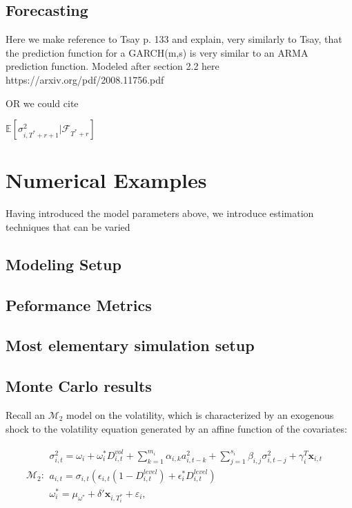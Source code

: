 \documentclass[11pt]{article}
\newcommand{\x}{\textbf{x}}
\def\mbf#1{\mathbf{#1}} %
\def\mc#1{\mathcal{#1}} %
\def\mc#1{\mathcal{#1}}
\theoremstyle{definition}
\begin{document}
\subsection{Forecasting}

Here we make reference to Tsay p. 133 and explain, very similarly to Tsay, that the prediction function for a GARCH(m,s) is very similar to an ARMA prediction function.  Modeled after section 2.2 here https://arxiv.org/pdf/2008.11756.pdf

OR we could cite \citet{zivot2009practical}

$\mathbb{E}[ \sigma^{2}_{i,T^{*}+r+1} |\mathcal{F}_{T^{*}+r}]$

\section{Numerical Examples}

Having introduced the model parameters above, we introduce estimation techniques that can be varied

\subsection{Modeling Setup}

\subsection{Peformance Metrics}

\subsection{Most elementary simulation setup}

\subsection{Monte Carlo results}
Recall an $\mc{M}_2$ model on the volatility, which is characterized by an exogenous shock to the volatility equation generated by an affine function of the covariates:

\begin{align*}
\mc{M}_2 \colon \begin{array}{l}
   \sigma^{2}_{i,t} = \omega_{i} + \omega^{*}_i D^{vol}_{i,t} + \sum^{m_{i}}_{k=1}\alpha_{i,k}a^{2}_{i,t-k} + \sum_{j=1}^{s_{i}}\beta_{i,j}\sigma_{i,t-j}^{2} + \gamma_{i}^{T} \x_{i,t} \text{ }\\[.2cm]
   a_{i,t} = \sigma_{i,t}(\epsilon_{i,t}(1-D^{level}_{i,t}) + \epsilon^{*}_{i}D^{level}_{i,t})\\[.2cm]
   \omega_i^{*} = \mu_{\omega^{*}}+\delta'\mbf{x}_{i, T_i^*}+ \varepsilon_{i},
\end{array}
\end{align*}
\end{document}
